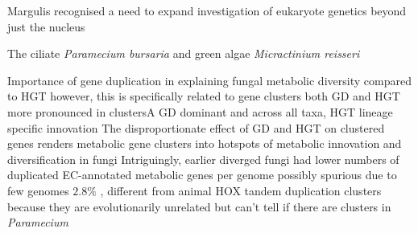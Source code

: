 Margulis recognised a need to expand investigation of eukaryote genetics beyond 
just the nucleus \citep{Archibald2012}


The ciliate \textit{Paramecium bursaria} and green algae \textit{Micractinium reisseri}




%







Importance of gene duplication in explaining fungal metabolic diversity compared to
HGT however, this is specifically related to gene clusters both GD and HGT more
pronounced in clustersA
GD dominant and across all taxa, HGT lineage specific innovation
The disproportionate effect of GD and HGT on clustered genes renders metabolic gene clusters into hotspots of metabolic innovation and diversification in fungi
Intriguingly, earlier diverged fungi had lower numbers of duplicated EC-annotated metabolic genes per genome possibly spurious due to few genomes
\begin{math} 2.8\% \end{math}
\citep{Wisecaver2014}, different from animal 
HOX tandem duplication clusters because they are evolutionarily unrelated
but can't tell if there 
are clusters in \textit{Paramecium}




